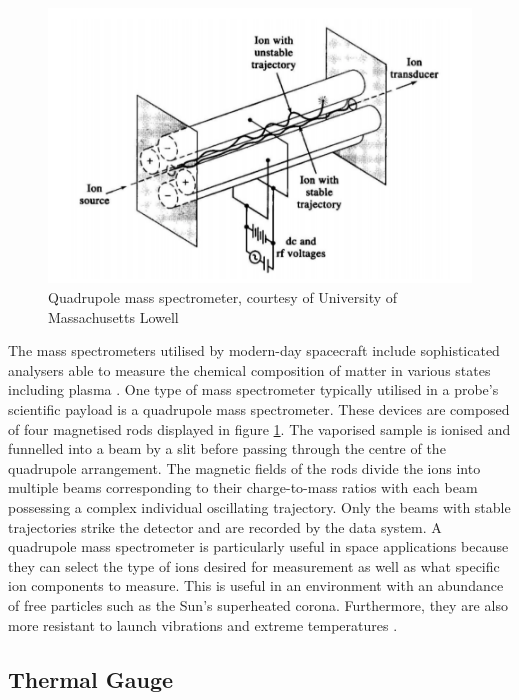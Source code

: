 \documentclass[12pt]{article}
\begin{document}
\begin{figure}[H]
    \centering
    \includegraphics[width = 12cm]{Media/Document/massspectrometer.PNG}
    \caption{Quadrupole mass spectrometer, courtesy of University of Massachusetts Lowell}
    \label{mass_spectrometer_diagram}
\end{figure}


The mass spectrometers utilised by modern-day spacecraft include sophisticated analysers able to measure the chemical composition of matter in various states including plasma \cite{massspectrometry}. One type of mass spectrometer typically utilised in a probe’s scientific payload is a quadrupole mass spectrometer. These devices are composed of four magnetised rods displayed in figure \ref{mass_spectrometer_diagram}. The vaporised sample is ionised and funnelled into a beam by a slit before passing through the centre of the quadrupole arrangement. The magnetic fields of the rods divide the ions into multiple beams corresponding to their charge-to-mass ratios with each beam possessing a complex individual oscillating trajectory. Only the beams with stable trajectories strike the detector and are recorded by the data system. A quadrupole mass spectrometer is particularly useful in space applications because they can select the type of ions desired for measurement as well as what specific ion components to measure. This is useful in an environment with an abundance of free particles such as the Sun’s superheated corona. Furthermore, they are also more resistant to launch vibrations and extreme temperatures \cite{quadrapole}. 

\vspace{\baselineskip}
\subsection{Thermal Gauge}
\vspace{\baselineskip}
\end{document}
